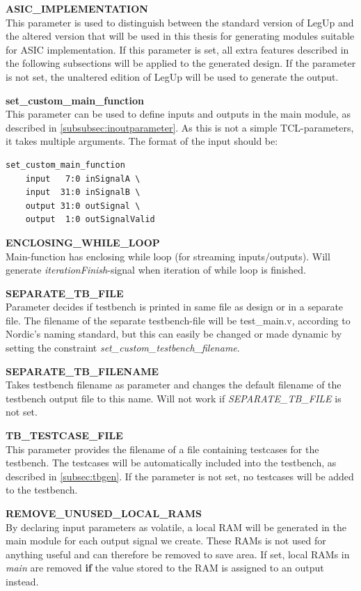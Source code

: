 \begin{description}
\item{\textbf{ASIC\_IMPLEMENTATION}} \hfill \\
This parameter is used to distinguish between the standard version of LegUp and the altered version that will be used in this thesis for generating modules suitable for ASIC implementation. If this parameter is set, all extra features described in the following subsections will be applied to the generated design. If the parameter is not set, the unaltered edition of LegUp will be used to generate the output.
\item{\textbf{set\_custom\_main\_function}} \hfill \\
This parameter can be used to define inputs and outputs in the main module, as described in \cref{subsubsec:inoutparameter}. As this is not a simple TCL-parameters, it takes multiple arguments. The format of the input should be:
\begin{verbatim}
set_custom_main_function 
    input   7:0 inSignalA \
    input  31:0 inSignalB \
    output 31:0 outSignal \
    output  1:0 outSignalValid
\end{verbatim}
\item{\textbf{ENCLOSING\_WHILE\_LOOP}} \hfill \\
Main-function has enclosing while loop (for streaming inputs/outputs). Will generate \textit{iterationFinish}-signal when iteration of while loop is finished.
\item{\textbf{SEPARATE\_TB\_FILE}} \hfill \\
Parameter decides if testbench is printed in same file as design or in a separate file. The filename of the separate testbench-file will be test\_main.v, according to Nordic's naming standard, but this can easily be changed or made dynamic by setting the constraint \textit{set\_custom\_testbench\_filename}.
\item{\textbf{SEPARATE\_TB\_FILENAME}} \hfill \\
Takes testbench filename as parameter and changes the default filename of the testbench output file to this name. Will not work if \textit{SEPARATE\_TB\_FILE} is not set.
\item{\textbf{TB\_TESTCASE\_FILE}} \hfill \\
This parameter provides the filename of a file containing testcases for the testbench. The testcases will be automatically included into the testbench, as described in \cref{subsec:tbgen}. If the parameter is not set, no testcases will be added to the testbench.
\item{\textbf{REMOVE\_UNUSED\_LOCAL\_RAMS}} \hfill \\
By declaring input parameters as volatile, a local RAM will be generated in the main module for each output signal we create. These RAMs is not used for anything useful and can therefore be removed to save area. If set, local RAMs in \textit{main} are removed \textbf{if} the value stored to the RAM is assigned to an output instead.
\end{description}

